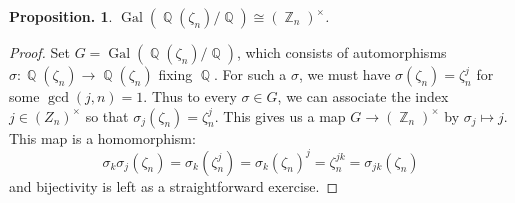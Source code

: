 \documentclass[11pt, a4paper]{memoir}
\DeclareMathOperator{\Q}{{\mathbb{Q}}}
\DeclareMathOperator{\Z}{{\mathbb{Z}}}
\theoremstyle{change}
\newtheorem{proposition}[theorem]{Proposition.}
\theoremstyle{plain}
\theoremstyle{nonumberplain}
\newtheorem{proof}{Proof}
\DeclareMathOperator{\Gal}{Gal}
\numberwithin{equation}{section}
\begin{document}
\begin{proposition}
    $\Gal(\Q(\zeta_n)/\Q)\cong(\Z_n)^\times$.
\end{proposition}
\begin{proof}
    Set $G=\Gal(\Q(\zeta_n)/\Q)$, which consists of automorphisms $\sigma:\Q(\zeta_n)\to\Q(\zeta_n)$ fixing $\Q$.
    For such a $\sigma$, we must have $\sigma(\zeta_n)=\zeta_n^j$ for some $\gcd(j,n)=1$.
    Thus to every $\sigma\in G$, we can associate the index $j\in(Z_n)^\times$ so that $\sigma_j(\zeta_n)=\zeta_n^j$.
    This gives us a map $G\to(\Z_n)^\times$ by $\sigma_j\mapsto j$.
    This map is a homomorphism:
    \begin{equation*}
        \sigma_k\sigma_j(\zeta_n)=\sigma_k(\zeta_n^j)=\sigma_k(\zeta_n)^j=\zeta_n^{jk}=\sigma_{jk}(\zeta_n)
    \end{equation*}
    and bijectivity is left as a straightforward exercise.
\end{proof}
\end{document}
